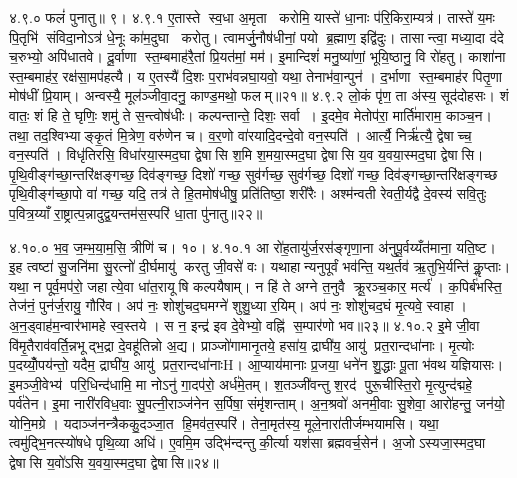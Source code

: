 ४.९.०
फलं॑ पुनातु॥ ९।
४.९.१
ए॒तास्ते स्व॒धा अ॒मृता करोमि॒ यास्ते॑ धा॒नाः प॑रि॒किरा॒म्यत्र॑। तास्ते॑ य॒मः पि॒तृभि॑ संविदा॒नोऽत्र॑ धे॒नूः का॑म॒दुघा करोतु। त्वामर्जु॒नौष॑धीनां॒ पयो ब्र॒ह्माण॒ इद्वि॑दुः। तासान्त्वा॒ मध्या॒दा द॑दे च॒रुभ्यो॒ अपि॑धातवे। दू॒र्वाणा स्त॒म्बमाह॑रै॒तां प्रि॒यत॑मां॒ मम॑। इ॒मान्दिशं॑ मनु॒ष्या॑णां॒ भूयि॒ष्ठानु॒ वि रो॑हतु। काशा॑ना स्त॒म्बमाह॑र॒ रक्ष॑सा॒मप॑हत्यै। य ए॒तस्यै॑ दि॒शः प॒राभ॑वन्नघा॒यवो॒ यथा॒ तेनाभ॑वा॒न्पुन॑। द॒र्भाणा स्त॒म्बमाह॑र पितृ॒णा मोष॑धीं प्रि॒याम्। अन्वस्यै॒ मूल॑ञ्जीवा॒दनु॒ काण्ड॒मथो॒ फलम्॥२१॥
४.९.२
लो॒कं पृ॑ण॒ ता अ॑स्य॒ सूद॑दोहसः। शं वातः॒ शं हि ते॒ घृणिः॒ शमु॑ ते स॒न्त्वोष॑धीः। कल्पन्तान्ते॒ दिशः॒ सर्वा। इ॒दमे॒व मेतोप॑रा॒ मार्ति॑माराम॒ काञ्च॒न। तथा॒ तद॒श्विभ्याङ्कृ॒तं मि॒त्रेण॒ वरु॑णेन च। व॒र॒णो वा॑रयादि॒दन्दे॒वो वन॒स्पति॑। आर्त्यै॒ निर्\mbox{}ऋ॑त्यै॒ द्वेषाच्च॒ वन॒स्पति॑। विधृ॑तिरसि॒ विधा॑रया॒स्मद॒घा द्वेषासि श॒मि श॒मया॒स्मद॒घा द्वेषासि य॒व य॒वया॒स्मद॒घा द्वेषासि। पृ॒थि॒वीङ्ग॑च्छा॒न्तरि॑क्षङ्गच्छ॒ दिव॑ङ्गच्छ॒ दिशो॑ गच्छ॒ सुव॑र्गच्छ॒ सुव॑र्गच्छ॒ दिशो॑ गच्छ॒ दिव॑ङ्गच्छा॒न्तरि॑क्षङ्गच्छ पृथि॒वीङ्ग॑च्छा॒पो वा॑ गच्छ॒ यदि॒ तत्र॑ ते हि॒तमोष॑धीषु॒ प्रति॑तिष्ठा॒ शरी॑रैः। अश्म॑न्वती रेवती॒र्यद्वै दे॒वस्य॑ सवि॒तुः प॒वित्र॒य्याँ रा॒ष्ट्रात्प॒न्नादुद्व॒यन्तम॑स॒स्परि॑ धा॒ता पु॑नातु॥२२॥
\anuvakamend

४.१०.०
भ॒व॒ ज॒म्भ॒या॒म॒सि॒ त्रीणि॑ च। १०।
४.१०.१
आ रो॑ह॒तायु॑र्ज॒रस॑ङ्गृणा॒ना अ॑नुपू॒र्वय्यँत॑माना॒ यति॒ष्ट। इ॒ह त्वष्टा॑ सु॒जनि॑मा सु॒रत्नो॑ दी॒र्घमायु॑ करतु जी॒वसे॑ वः। यथाहान्यनुपूर्वं भव॑न्ति॒ यथ॒र्तव॑ ऋ॒तुभि॒र्यन्ति॑ कॢ॒प्ताः। यथा॒ न पूर्व॒मप॑रो॒ जहात्ये॒वा धा॑त॒रायूषि कल्पयैषाम्। न हि॑ ते अग्ने त॒नुवै क्रू॒रञ्च॒कार॒ मर्त्य॑। क॒पिर्ब॑भस्ति॒ तेज॑नं॒ पुन॑र्ज॒रायु॒ गौरि॑व। अप॑ नः॒ शोशु॑चद॒घमग्ने॑ शुशु॒ध्या र॒यिम्। अप॑ नः॒ शोशु॑चद॒घं मृ॒त्यवे॒ स्वाहा। अ॒न॒ड्वाह॑म॒न्वार॑भामहे स्व॒स्तये। स न॒ इन्द्र॑ इव दे॒वेभ्यो॒ वह्नि॑ स॒म्पार॑णो भव॥२३॥
४.१०.२
इ॒मे जी॒वा वि॑मृ॒तैराव॑वर्ति॒न्नभूद्भ॒द्रा दे॒वहू॑तिन्नो अ॒द्य। प्राञ्जो॑गामानृ॒तये॒ हसा॑य॒ द्राघी॑य॒ आयु॑ प्रत॒रान्दधा॑नाः। मृ॒त्योः प॒दय्योँ॒पय॑न्तो॒ यदैम॒ द्राघी॑य॒ आयु॑ प्रत॒रान्दधा॑नाःH। आ॒प्याय॑मानाः प्र॒जया॒ धने॑न शु॒द्धाः पू॒ता भ॑वथ यज्ञियासः। इ॒मञ्जी॒वेभ्य॑ परि॒धिन्द॑धामि॒ मा नोऽनु॑ गा॒दप॑रो॒ अर्ध॑मे॒तम्। श॒तञ्जी॑वन्तु श॒रद॑ पुरू॒चीस्ति॒रो मृ॒त्युन्द॑द्महे॒ पर्व॑तेन। इ॒मा नारी॑रविध॒वाः सु॒पत्नी॒राञ्ज॑नेन स॒र्पिषा॒ संमृ॑शन्ताम्। अ॒न॒श्रवो॑ अनमी॒वाः सु॒शेवा॒ आरो॑हन्तु॒ जन॑यो॒ योनि॒मग्रे। यदाञ्ज॑नन्त्रैककु॒दञ्जा॒त हि॒मव॑त॒स्परि॑। तेना॒मृत॑स्य॒ मूले॒नारा॑तीर्जम्भयामसि। यथा॒ त्वमु॑द्भि॒नत्स्यो॑षधे पृथि॒व्या अधि॑। ए॒वमि॒म उद्भि॑न्दन्तु की॒र्त्या यश॑सा ब्रह्मवर्च॒सेन॑। अ॒जोऽस्यजा॒स्मद॒घा द्वेषासि य॒वो॑ऽसि य॒वया॒स्मद॒घा द्वेषासि॥२४॥
\anuvakamend

